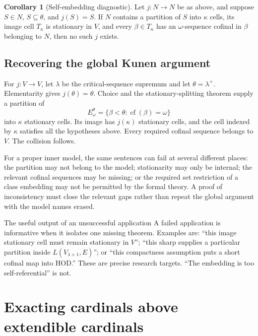 \documentclass[11pt,letterpaper]{article}
\theoremstyle{definition}
\newtheorem{corollary}[definition]{Corollary}
\newcommand{\cf}{\operatorname{cf}}
\begin{document}
\begin{corollary}[Self-embedding diagnostic]\label{cor:self}
Let $j:N\to N$ be as above, and suppose $S\in N$, $S\subseteq\theta$, and $j(S)=S$. If $N$ contains a partition of $S$ into $\kappa$ cells, its image cell $T_\kappa$ is stationary in $V$, and every $\beta\in T_\kappa$ has an $\omega$-sequence cofinal in $\beta$ belonging to $N$, then no such $j$ exists.
\end{corollary}

\subsection{Recovering the global Kunen argument}

For $j:V\to V$, let $\lambda$ be the critical-sequence supremum and let $\theta=\lambda^+$. Elementarity gives $j(\theta)=\theta$. Choice and the stationary-splitting theorem supply a partition of
\[
 E^\theta_\omega=\{\beta<\theta:\cf(\beta)=\omega\}
\]
into $\kappa$ stationary cells. Its image has $j(\kappa)$ stationary cells, and the cell indexed by $\kappa$ satisfies all the hypotheses above. Every required cofinal sequence belongs to $V$. The collision follows. \cite{kunen,hkp}

For a proper inner model, the same sentences can fail at several different places: the partition may not belong to the model; stationarity may only be internal; the relevant cofinal sequences may be missing; or the required set restriction of a class embedding may not be permitted by the formal theory. A proof of inconsistency must close the relevant gaps rather than repeat the global argument with the model names erased.

\begin{assessment}{The useful output of an unsuccessful application}
A failed application is informative when it isolates one missing theorem. Examples are: ``this image stationary cell must remain stationary in $V$''; ``this sharp supplies a particular partition inside $L(V_{\lambda+1},E)$''; or ``this compactness assumption puts a short cofinal map into HOD.'' These are precise research targets. ``The embedding is too self-referential'' is not.
\end{assessment}

\section{Exacting cardinals above extendible cardinals}\label{sec:exacting}
\end{document}
